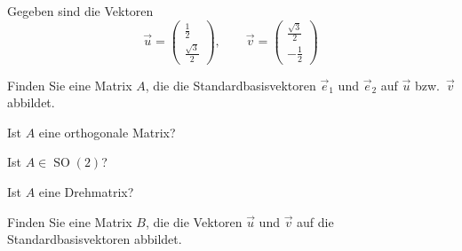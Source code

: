 Gegeben sind die Vektoren
\[
\vec u = \begin{pmatrix}\frac12\\\frac{\sqrt{3}}2\end{pmatrix},
\qquad
\vec v = \begin{pmatrix}\frac{\sqrt{3}}2\\-\frac12\end{pmatrix}
\]
\begin{teilaufgaben}
\item
Finden Sie eine Matrix $A$, die die Standardbasisvektoren $\vec e_1$ und
$\vec e_2$ auf $\vec u$ bzw.~$\vec v$ abbildet.
\item
Ist $A$ eine orthogonale Matrix?
\item
Ist $A\in \operatorname{SO}(2)$?
\item
Ist $A$ eine Drehmatrix?
\item
Finden Sie eine Matrix $B$, die die Vektoren $\vec u$ und $\vec v$ auf
die Standardbasisvektoren abbildet.
\end{teilaufgaben}

